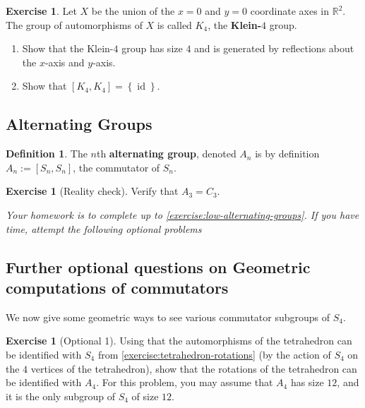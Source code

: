\documentclass[reqno, 12pt, letter]{article}
\theoremstyle{plain}
\theoremstyle{definition}
\newtheorem{definition}[theorem]{Definition}
\newtheorem{exercise}[theorem]{Exercise}
\theoremstyle{remark}
\numberwithin{equation}{section}
\newcommand\br{{\mathbb R}}
\DeclareMathOperator\id{id}
\begin{document}
\begin{exercise}
	\label{exercise:klein-4}
	Let $X$ be the union of the $x = 0$ and $y = 0$ coordinate axes in $\br^2$. The group of automorphisms of $X$ is called $K_4$, the {\bf Klein-$4$} group.
	\begin{enumerate}
		\item Show that the Klein-$4$ group has size $4$ and is generated by reflections about the $x$-axis and $y$-axis.
		\item Show that $\left[ K_4, K_4 \right] = \left\{ \id \right\}$.
	\end{enumerate}
\end{exercise}


\subsection{Alternating Groups}

\begin{definition}
	\label{definition:alternating}
	The $n$th {\bf alternating group}, denoted $A_n$ is by definition $A_n := \left[ S_n, S_n \right]$, the commutator of $S_n$.
\end{definition}
\begin{exercise}[Reality check]
	\label{exercise:low-alternating-groups}
	Verify that $A_3 = C_3$.
\end{exercise}

{\it Your homework is to complete up to \autoref{exercise:low-alternating-groups}. If you have time, attempt the following optional
problems}

\subsection{Further optional questions on Geometric computations of commutators}
We now give some geometric ways to see various commutator subgroups of $S_4$.
\begin{exercise}[Optional 1]
	\label{exercise:}
	Using that the automorphisms of the tetrahedron can be identified with $S_4$ from \autoref{exercise:tetrahedron-rotations} (by the action of
	$S_4$ on the $4$ vertices of the tetrahedron),
	show that the rotations of the tetrahedron can be identified with $A_4$. For this problem, you may assume that $A_4$ has size $12$, and
	it is the only subgroup of $S_4$ of size $12$.
\end{exercise}
\end{document}
